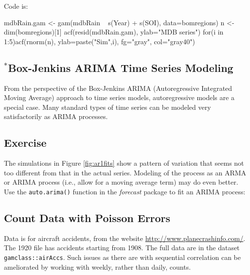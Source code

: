 \documentclass{tufte-book}\usepackage[]{graphicx}\usepackage[]{color}
\newcommand{\txtt}[1]{\texttt{#1}}
\begin{document}
Code is:
\begin{Schunk}
\begin{Sinput}
mdbRain.gam <- gam(mdbRain ~ s(Year) + s(SOI),
                   data=bomregions)
n <-  dim(bomregions)[1]
acf(resid(mdbRain.gam), ylab="MDB series")
for(i in 1:5)acf(rnorm(n), ylab=paste("Sim",i),
                 fg="gray", col="gray40")
\end{Sinput}
\end{Schunk}

\subsection{$^*$Box-Jenkins ARIMA Time Series Modeling}

From the perspective of the Box-Jenkins ARIMA (Autoregressive
Integrated Moving Average) approach to time series models,
autoregressive models are a special case.  Many standard types of time
series can be modeled very satisfactorily as ARIMA processes.

\subsection*{Exercise}
The simulations in Figure \ref{fig:ar1fits} show a pattern of
  variation that seems not too different from that in the actual series.
  Modeling of the process as an ARMA or ARIMA process (i.e., allow
  for a moving average term) may do even better.  Use the
  \txtt{auto.arima()} function in the {\em forecast} package to fit an
  ARIMA process:

\subsection{Count Data with Poisson Errors}

Data is for aircraft accidents, from the website
\url{http://www.planecrashinfo.com/}.  The 1920 file has
accidents starting from 1908. The full data are in the
dataset \txtt{gamclass::airAccs}.
Such issues as there are with sequential correlation
can be ameliorated by working with weekly, rather than daily,
counts. 
\end{document}
